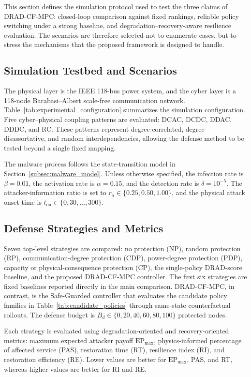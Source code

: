 \documentclass[lettersize,journal]{IEEEtran}
\begin{document}
This section defines the simulation protocol used to test the three claims of DRAD-CF-MPC: closed-loop comparison against fixed rankings, reliable policy switching under a strong baseline, and degradation--recovery-aware resilience evaluation. The scenarios are therefore selected not to enumerate cases, but to stress the mechanisms that the proposed framework is designed to handle.

\subsection{Simulation Testbed and Scenarios}
\label{subsec:simulation_networks}

The physical layer is the IEEE 118-bus power system, and the cyber layer is a 118-node Barabasi--Albert scale-free communication network. Table~\ref{tab:experimental_configuration} summarizes the simulation configuration. Five cyber--physical coupling patterns are evaluated: DCAC, DCDC, DDAC, DDDC, and RC. These patterns represent degree-correlated, degree-disassortative, and random interdependencies, allowing the defense method to be tested beyond a single fixed mapping.

The malware process follows the state-transition model in Section~\ref{subsec:malware_model}. Unless otherwise specified, the infection rate is $\beta=0.01$, the activation rate is $\alpha=0.15$, and the detection rate is $\delta=10^{-5}$. The attacker-information ratio is set to $r_a\in\{0.25,0.50,1.00\}$, and the physical attack onset time is $t_{\mathrm{on}}\in\{0,30,\ldots,300\}$.

\subsection{Defense Strategies and Metrics}
\label{subsec:defense_settings}

Seven top-level strategies are compared: no protection (NP), random protection (RP), communication-degree protection (CDP), power-degree protection (PDP), capacity or physical-consequence protection (CP), the single-policy DRAD-score baseline, and the proposed DRAD-CF-MPC controller. The first six strategies are fixed baselines reported directly in the main comparison. DRAD-CF-MPC, in contrast, is the Safe-Guarded controller that evaluates the candidate policy families in Table~\ref{tab:candidate_policies} through same-state counterfactual rollouts. The defense budget is $B_d\in\{0,20,40,60,80,100\}$ protected nodes.

Each strategy is evaluated using degradation-oriented and recovery-oriented metrics: maximum expected attacker payoff $\mathrm{EP}_{\max}$, physics-informed percentage of affected service (PAS), restoration time (RT), resilience index (RI), and restoration efficiency (RE). Lower values are better for $\mathrm{EP}_{\max}$, PAS, and RT, whereas higher values are better for RI and RE.
\end{document}
